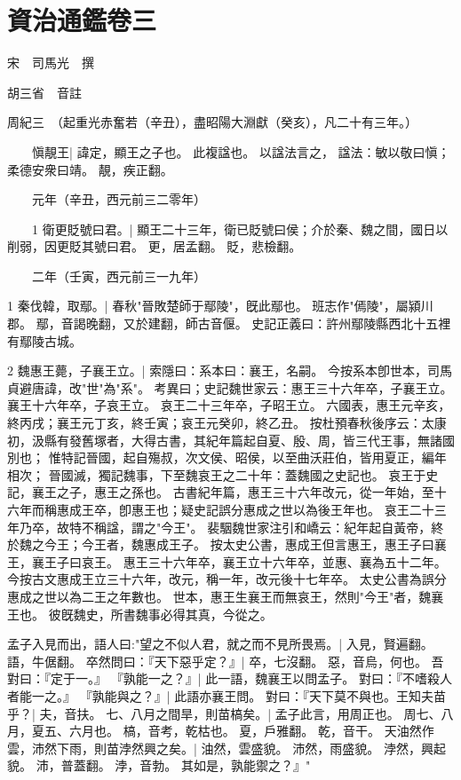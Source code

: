 \chapter{資治通鑑卷三}

宋　司馬光　撰

胡三省　音註

周紀三　（起重光赤奮若（辛丑），盡昭陽大淵獻（癸亥），凡二十有三年。）

　　愼靚王|{
	諱定，顯王之子也。
	此複諡也。
	以諡法言之，
	諡法：敏以敬曰愼；柔德安衆曰靖。
	靚，疾正翻。
}


　　元年（辛丑，西元前三二零年）

　　1 衛更貶號曰君。|{
	顯王二十三年，衛已貶號曰侯；介於秦、魏之間，國日以削弱，因更貶其號曰君。
	更，居孟翻。
	貶，悲檢翻。
}

　　二年（壬寅，西元前三一九年）

1 秦伐韓，取鄢。|{
	春秋"晉敗楚師于鄢陵"，旣此鄢也。
	班志作"傿陵"，屬潁川郡。
	鄢，音謁晚翻，又於建翻，師古音偃。
	史記正義曰：許州鄢陵縣西北十五裡有鄢陵古城。
}

2 魏惠王薨，子襄王立。|{
	索隱曰：系本曰：襄王，名嗣。
	今按系本卽世本，司馬貞避唐諱，改"世"為"系"。
	考異曰；史記魏世家云：惠王三十六年卒，子襄王立。
	襄王十六年卒，子哀王立。
	哀王二十三年卒，子昭王立。
	六國表，惠王元辛亥，終丙戌；襄王元丁亥，終壬寅；哀王元癸卯，終乙丑。
	按杜預春秋後序云：太康初，汲縣有發舊塚者，大得古書，其紀年篇起自夏、殷、周，皆三代王事，無諸國別也；
	惟特記晉國，起自殤叔，次文侯、昭侯，以至曲沃莊伯，皆用夏正，編年相次；
	晉國滅，獨記魏事，下至魏哀王之二十年：蓋魏國之史記也。
	哀王于史記，襄王之子，惠王之孫也。
	古書紀年篇，惠王三十六年改元，從一年始，至十六年而稱惠成王卒，卽惠王也；疑史記誤分惠成之世以為後王年也。
	哀王二十三年乃卒，故特不稱諡，謂之"今王"。
	裴駰魏世家注引和嶠云：紀年起自黃帝，終於魏之今王；今王者，魏惠成王子。
	按太史公書，惠成王但言惠王，惠王子曰襄王，襄王子曰哀王。
	惠王三十六年卒，襄王立十六年卒，並惠、襄為五十二年。
	今按古文惠成王立三十六年，改元，稱一年，改元後十七年卒。
	太史公書為誤分惠成之世以為二王之年數也。
	世本，惠王生襄王而無哀王，然則"今王"者，魏襄王也。
	彼旣魏史，所書魏事必得其真，今從之。
}

	孟子入見而出，語人曰:"望之不似人君，就之而不見所畏焉。|{
	入見，賢遍翻。
	語，牛倨翻。
}
卒然問曰：『天下惡乎定？』|{
	卒，七沒翻。
	惡，音烏，何也。
}
吾對曰：『定于一。』
『孰能一之？』|{
	此一語，魏襄王以問孟子。
}
對曰：『不嗜殺人者能一之。』
『孰能與之？』|{
	此語亦襄王問。
}
對曰：『天下莫不與也。王知夫苗乎？|{
	夫，音扶。
}
七、八月之間旱，則苗槁矣。|{
	孟子此言，用周正也。
	周七、八月，夏五、六月也。
	槁，音考，乾枯也。
	夏，戶雅翻。
	乾，音干。
}
天油然作雲，沛然下雨，則苗浡然興之矣。|{
	油然，雲盛貌。
	沛然，雨盛貌。
	浡然，興起貌。
	沛，普蓋翻。
	浡，音勃。
}
其如是，孰能禦之？』"

